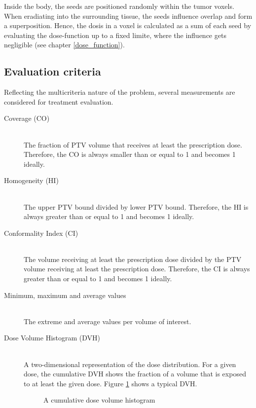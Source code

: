 \documentclass[12pt]{article}
\begin{document}
Inside the body, the seeds are positioned randomly within the tumor voxels. When eradiating into the surrounding tissue, the seeds influence overlap and form a superposition. Hence, the dosis in a voxel is calculated as a sum of each seed by evaluating the dose-function up to a fixed limite, where the influence gets negligible (see chapter \ref{dose_function}).

\subsection{Evaluation criteria}
	Reflecting the multicriteria nature of the problem, several measurements are considered for treatment evaluation.
	\begin{description}
		\item[Coverage (CO)]~\\
			The fraction of PTV volume that receives at least the prescription dose. Therefore, the CO is always smaller than or equal to 1 and becomes 1 ideally.
		\item[Homogeneity (HI)]~\\
			The upper PTV bound divided by lower PTV bound. Therefore, the HI is always greater than or equal to 1 and becomes 1 ideally.
		\item[Conformality Index (CI)]~\\
			The volume receiving at least the prescription dose divided by the PTV volume receiving at least the prescription dose. Therefore, the CI is always greater than or equal to 1 and becomes 1 ideally.
		\item[Minimum, maximum and average values]~\\
			The extreme and average values per volume of interest.
		\item[Dose Volume Histogram (DVH)]~\\
			A two-dimensional representation of the dose distribution. For a given dose, the cumulative DVH shows the fraction of a volume that is exposed to at least the given dose. Figure \ref{fig:evalCritDVH} shows a typical DVH.
			\begin{figure}[ht]
				\centering
				 
				\caption{A cumulative dose volume histogram}
				\label{fig:evalCritDVH}
			\end{figure}
			


\end{description}
\end{document}

